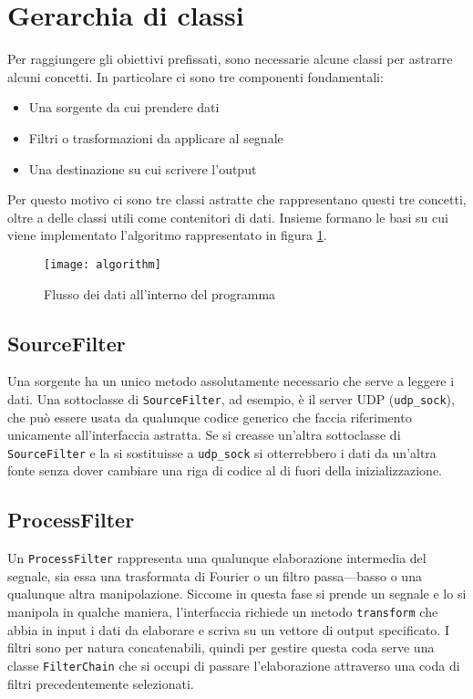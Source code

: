\section{Gerarchia di classi}
Per raggiungere gli obiettivi prefissati, sono necessarie alcune classi per
astrarre alcuni concetti. In particolare ci sono tre componenti fondamentali:
\begin{itemize}
\item Una sorgente da cui prendere dati
\item Filtri o trasformazioni da applicare al segnale
\item Una destinazione su cui scrivere l'output
\end{itemize}
Per questo motivo ci sono tre classi astratte che rappresentano questi tre
concetti, oltre a delle classi utili come contenitori di dati. Insieme
formano le basi su cui viene implementato l'algoritmo rappresentato in
figura \ref{fig:algorithm}.
\begin{figure}[htb]
	\begin{center}
		\texttt{[image: algorithm]}
	\end{center}
	\caption{Flusso dei dati all'interno del programma}
	\label{fig:algorithm}
\end{figure}

\subsection{SourceFilter}
Una sorgente ha un unico metodo assolutamente necessario che serve a leggere i
dati. Una sottoclasse di \texttt{SourceFilter}, ad esempio, \`e il server UDP
(\texttt{udp\_sock}), che pu\`o essere usata da qualunque codice generico che
faccia riferimento unicamente all'interfaccia astratta. Se si creasse un'altra
sottoclasse di \texttt{SourceFilter} e la si sostituisse a \texttt{udp\_sock} si
otterrebbero i dati da un'altra fonte senza dover cambiare una riga di codice al
di fuori della inizializzazione.
\subsection{ProcessFilter}
Un \texttt{ProcessFilter} rappresenta una qualunque elaborazione intermedia del
segnale, sia essa una trasformata di Fourier o un filtro passa---basso o una
qualunque altra manipolazione. Siccome in questa fase si prende un segnale e lo
si manipola in qualche maniera, l'interfaccia richiede un metodo
\texttt{transform} che abbia in input i dati da elaborare e scriva su un vettore
di output specificato. I filtri sono per natura concatenabili, quindi per
gestire questa coda serve una classe \texttt{FilterChain} che si occupi di
passare l'elaborazione attraverso una coda di filtri precedentemente
selezionati.
